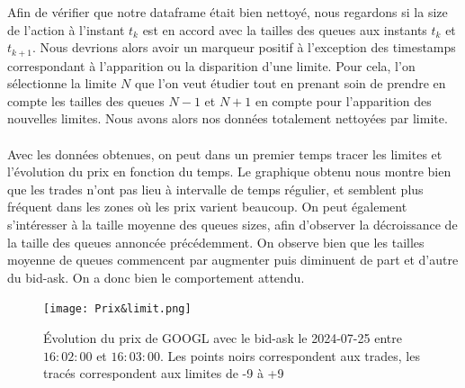\documentclass[12pt,a4paper]{article}
\theoremstyle{definition}
\theoremstyle{remark}
\begin{document}
Afin de vérifier que notre dataframe était bien nettoyé, nous regardons si la size de l'action à l'instant $t_k$ est en accord avec la tailles des queues aux instants $t_k$ et $t_{k+1}$. Nous devrions alors avoir un marqueur positif à l'exception des timestamps correspondant à l'apparition ou la disparition d'une limite. Pour cela, l'on sélectionne la limite $N$ que l'on veut étudier tout en prenant soin de prendre en compte les tailles des queues $N-1$ et $N+1$ en compte pour l'apparition des nouvelles limites. Nous avons alors nos données totalement nettoyées par limite. 
\\
\\
Avec les données obtenues, on peut dans un premier temps tracer les limites et l'évolution du prix en fonction du temps. Le graphique obtenu nous montre bien que les trades n'ont pas lieu à intervalle de temps régulier, et semblent plus fréquent dans les zones où les prix varient beaucoup.
On peut également s'intéresser à la taille moyenne des queues sizes, afin d'observer la décroissance de la taille des queues annoncée précédemment. On observe bien que les tailles moyenne de queues commencent par augmenter puis diminuent de part et d'autre du bid-ask. On a donc bien le comportement attendu.
\begin{figure}[h!]
    \centering
    \texttt{[image: Prix\&limit.png]}
    \caption{Évolution du prix de GOOGL avec le bid-ask le 2024-07-25 entre $16:02:00$ et $16:03:00$. Les points noirs correspondent aux trades, les tracés correspondent aux limites de -9 à +9}
    \label{fig:graph}
\end{figure}
\end{document}

